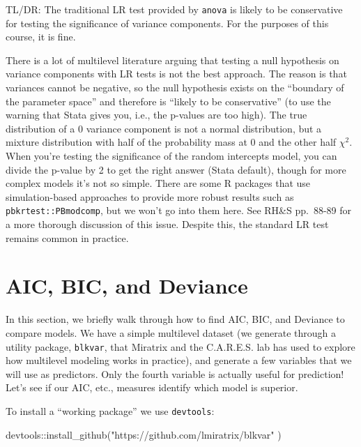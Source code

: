\documentclass[
  letterpaper,
  DIV=11,
  numbers=noendperiod]{scrreprt}
\newenvironment{Shaded}{}{}
\newcommand{\FunctionTok}[1]{\textcolor[rgb]{0.02,0.16,0.49}{#1}}
\newcommand{\NormalTok}[1]{#1}
\newcommand{\SpecialCharTok}[1]{\textcolor[rgb]{0.25,0.44,0.63}{#1}}
\newcommand{\StringTok}[1]{\textcolor[rgb]{0.25,0.44,0.63}{#1}}
\begin{document}
TL/DR: The traditional LR test provided by \texttt{anova} is likely to
be conservative for testing the significance of variance components. For
the purposes of this course, it is fine.

There is a lot of multilevel literature arguing that testing a null
hypothesis on variance components with LR tests is not the best
approach. The reason is that variances cannot be negative, so the null
hypothesis exists on the ``boundary of the parameter space'' and
therefore is ``likely to be conservative'' (to use the warning that
Stata gives you, i.e., the p-values are too high). The true distribution
of a 0 variance component is not a normal distribution, but a mixture
distribution with half of the probability mass at 0 and the other half
\(\chi^2\). When you're testing the significance of the random
intercepts model, you can divide the p-value by 2 to get the right
answer (Stata default), though for more complex models it's not so
simple. There are some R packages that use simulation-based approaches
to provide more robust results such as \texttt{pbkrtest::PBmodcomp}, but
we won't go into them here. See RH\&S pp.~88-89 for a more thorough
discussion of this issue. Despite this, the standard LR test remains
common in practice.

\chapter{AIC, BIC, and Deviance}\label{aic-bic-and-deviance}

In this section, we briefly walk through how to find AIC, BIC, and
Deviance to compare models. We have a simple multilevel dataset (we
generate through a utility package, \texttt{blkvar}, that Miratrix and
the C.A.R.E.S. lab has used to explore how multilevel modeling works in
practice), and generate a few variables that we will use as predictors.
Only the fourth variable is actually useful for prediction! Let's see if
our AIC, etc., measures identify which model is superior.

To install a ``working package'' we use \texttt{devtools}:

\begin{Shaded}
\begin{Highlighting}[]
\NormalTok{devtools}\SpecialCharTok{::}\FunctionTok{install\_github}\NormalTok{(}\StringTok{"https://github.com/lmiratrix/blkvar"}\NormalTok{ )}
\end{Highlighting}
\end{Shaded}
\end{document}
